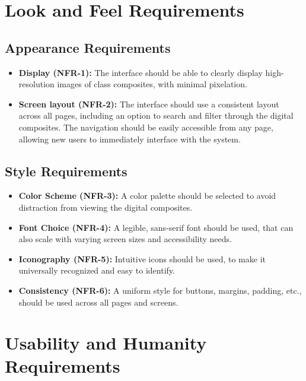 \documentclass[12pt]{article}
\begin{document}
\vspace{1em}

\section{Look and Feel Requirements}

\subsection{Appearance Requirements}
\begin{itemize}
    \item \textbf{Display (NFR-1):} The interface should be able to clearly display high-resolution images of class composites, with minimal pixelation.
    \item \textbf{Screen layout (NFR-2):} The interface should use a consistent layout across all pages, including an option to search and filter through the digital composites. The navigation should be easily accessible from any page, allowing new users to immediately interface with the system.
\end{itemize}

\subsection{Style Requirements}
\begin{itemize}
    \item \textbf{Color Scheme (NFR-3):} A color palette should be selected to avoid distraction from viewing the digital composites.
    \item \textbf{Font Choice (NFR-4):} A legible, sans-serif font should be used, that can also scale with varying screen sizes and accessibility needs.
    \item \textbf{Iconography (NFR-5):} Intuitive icons should be used, to make it universally recognized and easy to identify.
    \item \textbf{Consistency (NFR-6):} A uniform style for buttons, margins, padding, etc., should be used across all pages and screens.
\end{itemize}

\section{Usability and Humanity Requirements}
\end{document}
